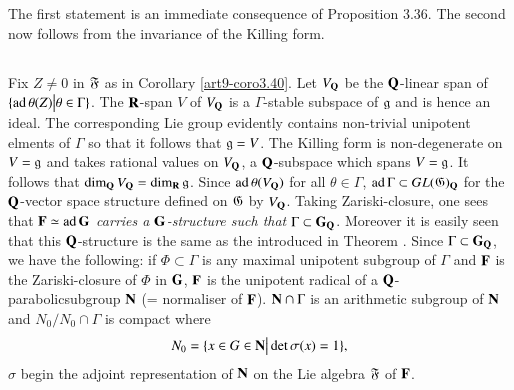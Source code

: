 The first statement is an immediate consequence of Proposition 3.36. The second now follows from the invariance of the Killing form.

\setcounter{subsection}{40}
\subsection{}\label{art9-subsec3.41}
Fix $Z \neq 0$ in $\mathfrak{F}$ as in Corollary \ref{art9-coro3.40}. Let $V_{\mathbf{Q}}$ be the $\mathbf{Q}$-linear span of $\{\operatorname{ad}  \theta(Z) \big| \theta \in\Gamma\}$. The $\mathbf{R}$-span $V$ of $V_{\mathbf{Q}}$ is a $\Gamma$-stable subspace of $\mathfrak{g}$ and is hence an ideal. The corresponding Lie group evidently contains non-trivial unipotent elments of $\Gamma$ so that it follows that $\mathfrak{g} = V$. The Killing form is non-degenerate on $V = \mathfrak{g}$ and takes rational values on $V_{\mathbf{Q}}$, a $\mathbf{Q}$-subspace which spans $V = \mathfrak{g}$. It follows that $\dim_{\mathbf{Q}} V_{\mathbf{Q}} = \dim_{\mathbf{R}} \mathfrak{g}$. Since $\operatorname{ad} \theta (V_{\mathbf{Q}})$ for all $\theta \in \Gamma$, $\operatorname{ad} \Gamma \subset GL (\mathfrak{G})_{\mathbf{Q}}$ for the $\mathbf{Q}$-vector space structure defined on $\mathfrak{G}$ by $V_{\mathbf{Q}}$. Taking Zariski-closure, one sees that $\mathbf{F} \simeq \operatorname{ad} \mathbf{G}$ \textit{ carries a $\mathbf{G}$-structure such that $\Gamma \subset \mathbf{G}_{\mathbf{Q}}$}. Moreover it is easily seen that this $\mathbf{Q}$-structure is the same as the introduced in Theorem \label{art9-thm3.37}. Since $\Gamma \subset \mathbf{G}_{\mathbf{Q}}$, we have the following: if $\Phi \subset \Gamma$ is any maximal unipotent subgroup of $\Gamma$ and $\mathbf{F}$ is the Zariski-closure of $\Phi$ in $\mathbf{G}$, $\mathbf{F}$ is the unipotent radical of a $\mathbf{Q}$-parabolic\pageoriginale subgroup $\mathbf{N}$ (= normaliser of $\mathbf{F}$). $\mathbf{N} \cap \Gamma$ is an arithmetic subgroup of $\mathbf{N}$ and $N_0 / N_0 \cap \Gamma$ is compact where
$$
N_0 = \{x \in G \in \mathbf{N} \big| \det \sigma (x) = 1\},
$$
$\sigma$ begin the adjoint representation of $\mathbf{N}$ on the Lie algebra $\mathfrak{F}$ of $\mathbf{F}$.

\setcounter{subsection}{41}
